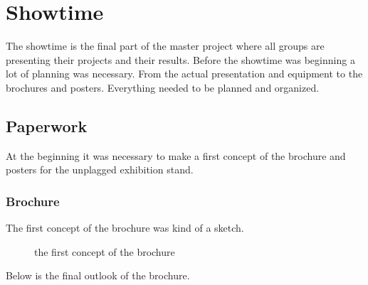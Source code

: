 \chapter{Showtime}\label{chap:Showtime}

The showtime is the final part of the master project where all groups are presenting their projects and their results.
Before the showtime was beginning a lot of planning was necessary. From the actual presentation and equipment to the brochures and posters. Everything needed to be planned and organized.

\section{Paperwork}
At the beginning it was necessary to make a first concept of the brochure and posters for the unplagged exhibition stand.

\pagebreak

\subsection{Brochure}
The first concept of the brochure was kind of a sketch.

\begin{figure}[!h]
  \centering
  \caption{the first concept of the brochure}
  \label{fig:brochure_sketch}
\end{figure}
\pagebreak
Below is the final outlook of the brochure.

